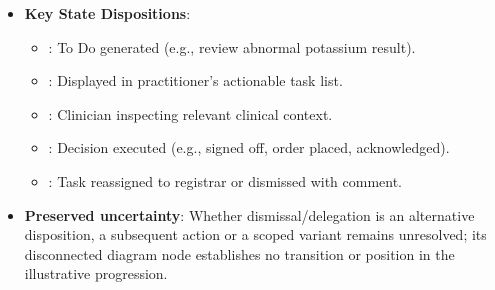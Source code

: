 \begin{itemize}

\item
\textbf{Key State Dispositions}:


\begin{itemize}

\item
\texttt{}: To Do generated (e.g., review abnormal potassium result).



\item
\texttt{}: Displayed in practitioner's actionable task list.



\item
\texttt{}: Clinician inspecting relevant clinical context.



\item
\texttt{}: Decision executed (e.g., signed off, order placed, acknowledged).



\item
\texttt{}: Task reassigned to registrar or dismissed with comment.



\end{itemize}


\item
\textbf{Preserved uncertainty}: Whether dismissal/\allowbreak{}delegation is an alternative disposition, a subsequent action or a scoped variant remains unresolved; its disconnected diagram node establishes no transition or position in the illustrative progression.



\end{itemize}

\par\smallskip

